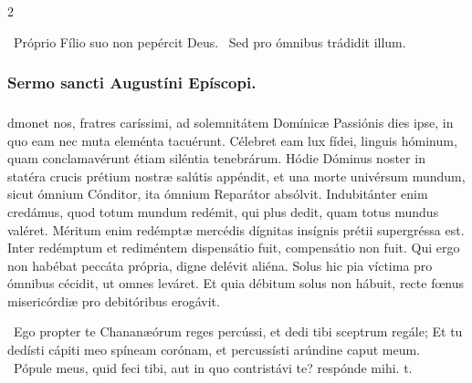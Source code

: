 \documentclass[9pt,twoside]{extarticle}
\begin{document}
\begin{multicols}{2}
\begin{tightlist}{}
\item {}~Próprio Fílio suo non pepércit Deus. ~Sed pro ómnibus trádidit illum.
\end{tightlist}

\subsubsection*{\center Sermo sancti Augustíni Epíscopi.}
\subsubsection*{\center {}}
dmonet nos, fratres caríssimi, ad solemnitátem Domínicæ Passiónis dies ipse, in quo eam nec muta eleménta tacuérunt. Célebret eam lux fídei, linguis hóminum, quam conclamavérunt étiam siléntia tenebrárum. Hódie Dóminus noster in statéra crucis prétium nostræ salútis appéndit, et una morte univérsum mundum, sicut ómnium Cónditor, ita ómnium Reparátor absólvit. Indubitánter enim credámus, quod totum mundum redémit, qui plus dedit, quam totus mundus valéret. Méritum enim redémptæ mercédis dígnitas insígnis prétii supergréssa est. Inter redémptum et rediméntem dispensátio fuit, compensátio non fuit. Qui ergo non habébat peccáta própria, digne delévit aliéna. Solus hic pia víctima pro ómnibus cécidit, ut omnes leváret. Et quia débitum solus non hábuit, recte fœnus misericórdiæ pro debitóribus erogávit.

\begin{tightlist}{}
\item {}~Ego propter te Chananæórum reges percússi, et dedi tibi sceptrum regále; \textred{*} Et tu dedísti cápiti meo spíneam corónam, et percussísti arúndine caput meum. ~Pópule meus, quid feci tibi, aut in quo contristávi te? respónde mihi. t.
\end{tightlist}


\end{multicols}
\end{document}

